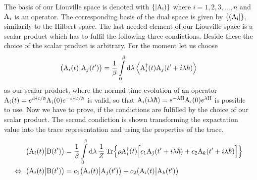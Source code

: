 The basis of our Liouville space is denoted with $\{|\mathrm{\mathrm{A}_{i}})\}$ where $i = 1,2,3,\dots,n$ and $\mathrm{A}_{i}$ is an operator.
The corresponding basis of the dual space is given by $\{(\mathrm{\mathrm{A}_{i}}|\}$, similarily to the Hilbert space.
The last needed element of our Liouville space is a scalar product which has to fulfil the following three condictions.
%
%
Beside these the choice of the scalar product is arbitrary.
For the moment let us choose 
%
\begin{align}
	\big({\mathrm{A}_{i}(t)}\big|{\mathrm{A}_{j}(t')}\big) = \frac{1}{\beta} \int\limits_{0}^{\beta} \dd{\lambda} \expval{\mathrm{A}_{i}^{\dag}(t) \mathrm{A}_{j}(t'+i\lambda\hbar)}
	\label{eq:scalar product Liouville space2.0}
\end{align}
%
as our scalar product, where the normal time evolution of an operator \linebreak $\mathrm{A}_{i}(t) = e^{i\mathrm{H}t/\hbar} \mathrm{A}_{i}(0) e^{-i\mathrm{H}t/\hbar}$ is valid, so that $\mathrm{A}_{i}(i\lambda\hbar) = e^{-\lambda\mathrm{H}} \mathrm{A}_{i}(0) e^{\lambda\mathrm{H}}$ is possible to use.
Now we have to prove, if the condictions are fulfilled by the choice of our scalar product.
The second condiction is shown transforming the expactation value into the trace representation and using the properties of the trace.
%
\begin{align}
	\big({\mathrm{A}_{i}(t)}\big|{\mathrm{B}(t')}\big) &= \frac{1}{\beta} \int\limits_{0}^{\beta} \dd{\lambda} \frac{1}{Z} \Tr{\rho \mathrm{A}_{i}^{\dag}(t) \Big[c_{1} \mathrm{A}_{j}(t'+i\lambda\hbar) + c_{2} \mathrm{A}_{k}(t'+i\lambda\hbar)\Big]}
	\notag \\
	\Leftrightarrow\ \big({\mathrm{A}_{i}(t)}\big|{\mathrm{B}(t')}\big) &= c_{1} \big({\mathrm{A}_{i}(t)}\big|{\mathrm{A}_{j}(t')}\big) + c_{2} \big({\mathrm{A}_{i}(t)}\big|{\mathrm{A}_{k}(t')}\big)
\end{align}
